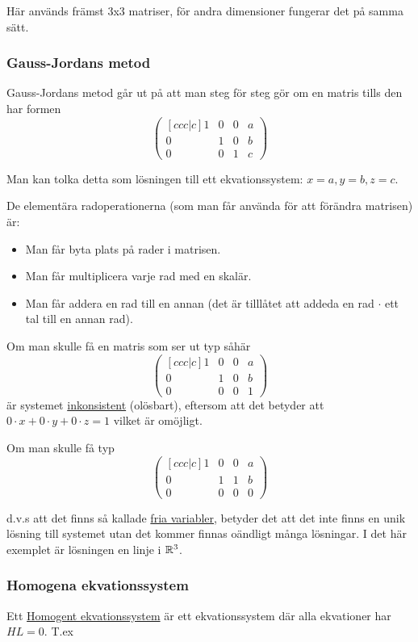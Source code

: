 \documentclass[../main.tex]{subfiles}
\begin{document}
Här används främst 3x3 matriser, för andra dimensioner fungerar det på samma sätt.

\subsubsection{Gauss-Jordans metod}
\label{gaussjordan}
Gauss-Jordans metod går ut på att man steg för steg gör om en matris tills den har formen
$$
\begin{pmatrix}[ccc|c]
  1 & 0 & 0 & a\\
  0 & 1 & 0 & b\\
  0 & 0 & 1 & c
\end{pmatrix} 
$$

Man kan tolka detta som lösningen till ett ekvationssystem: $x = a, y = b, z = c$.

De elementära radoperationerna (som man får använda för att förändra matrisen) är:
\begin{itemize}
    \item Man får byta plats på rader i matrisen.
    \item Man får multiplicera varje rad med en skalär.
    \item Man får addera en rad till en annan (det är tilllåtet att addeda en rad $\cdot$ ett tal till en annan rad).
\end{itemize}

Om man skulle få en matris som ser ut typ såhär
$$
\begin{pmatrix}[ccc|c]
  1 & 0 & 0 & a\\
  0 & 1 & 0 & b\\
  0 & 0 & 0 & 1
\end{pmatrix} 
$$
är systemet \underline{inkonsistent} (olösbart), eftersom att det betyder att $0\cdot x + 0\cdot y + 0\cdot z = 1$ vilket är omöjligt.

Om man skulle få typ
$$
\begin{pmatrix}[ccc|c]
  1 & 0 & 0 & a\\
  0 & 1 & 1 & b\\
  0 & 0 & 0 & 0
\end{pmatrix} 
$$

d.v.s att det finns så kallade \underline{fria variabler}, betyder det att det inte finns en unik lösning till systemet utan det kommer finnas oändligt många lösningar. I det här exemplet är lösningen en linje i $\mathbb{R}^{3}$.

\subsubsection{Homogena ekvationssystem}
\label{homogentekvationssystem}
Ett \underline{Homogent ekvationssystem} är ett ekvationssystem där alla ekvationer har $HL = 0$. T.ex
\end{document}
